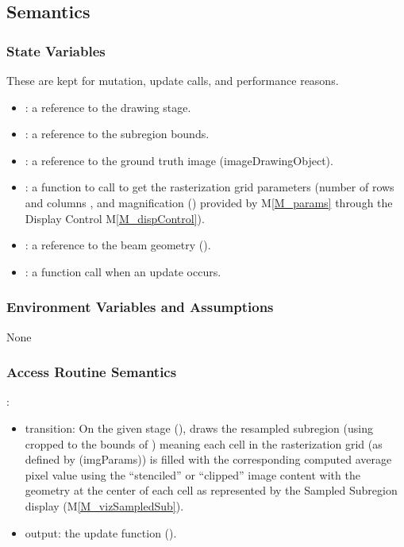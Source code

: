 \documentclass[12pt, titlepage]{article}
\newcommand{\mref}[1]{M\ref{#1}}
\newcommand{\mrefp}[1]{(\mref{#1})}
\begin{document}
\subsection{Semantics}

\subsubsection{State Variables}
These are kept for mutation, update calls, and performance reasons.
\begin{itemize}
  \item {}: a reference to the drawing stage.
  \item {}: a reference to the subregion bounds.
  \item {}: a reference to the ground truth image (imageDrawingObject).
  \item {}: a function to call to get the rasterization
    grid parameters (number of rows  and columns ,
    and magnification () 
    provided by \mref{M_params}
    through the Display Control \mref{M_dispControl}).
  \item {}: a reference to the beam geometry ().
  \item {}: a function call when an update occurs.
\end{itemize}

\subsubsection{Environment Variables and Assumptions}
None

\subsubsection{Access Routine Semantics}

\noindent {}:
\begin{itemize}
\item transition: On the given stage (), draws the resampled subregion
  (using  cropped to the bounds of )
  meaning each cell in the rasterization grid (as defined by \code(imgParams))
  is filled with the corresponding computed average pixel value using
  the ``stenciled'' or ``clipped'' image content with the  geometry
  at the center of each cell as represented by the Sampled Subregion
  display \mrefp{M_vizSampledSub}.
\item output: the update function ().
\end{itemize}
\end{document}
